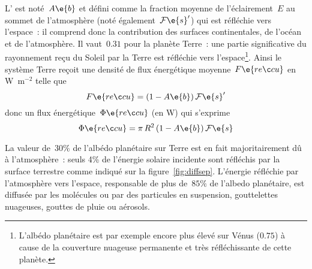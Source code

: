 \sk
L' est noté~$A\e{b}$ et défini comme la fraction moyenne de l'éclairement~$E$ au sommet de l'atmosphère (noté également~$\mathcal{F}\e{s}'$) qui est réfléchie vers l'espace~: il comprend donc la contribution des surfaces continentales, de l'océan et de l'atmosphère. Il vaut~$0.31$ pour la planète Terre~: une partie significative du rayonnement reçu du Soleil par la Terre est réfléchie vers l'espace\footnote{L'albédo planétaire est par exemple encore plus élevé sur Vénus ($0.75$) à cause de la couverture nuageuse permanente et très réfléchissante de cette planète.}. Ainsi le système Terre reçoit une densité de flux énergétique moyenne~$F\e{reçu}$ en W~m$^{-2}$ telle que
\[ F\e{reçu} = (1-A\e{b}) \, \mathcal{F}\e{s}' \] 
donc un flux énergétique~$\Phi\e{reçu}$ (en W) qui s'exprime
\[ \Phi\e{reçu} = \pi \, R^2 \, (1-A\e{b}) \, \mathcal{F}\e{s} \]

\sk
La valeur de~$30\%$ de l'albédo planétaire sur Terre est en fait majoritairement dû à l'atmosphère~:  seuls 4\% de l'énergie solaire incidente sont réfléchis par la surface terrestre comme indiqué sur la figure~\ref{fig:diffsep}. L'énergie réfléchie par l'atmosphère vers l'espace, responsable de plus de~$85\%$ de l'albedo planétaire, est diffusée par les molécules ou par des particules en suspension, gouttelettes nuageuses, gouttes de pluie ou aérosols.

